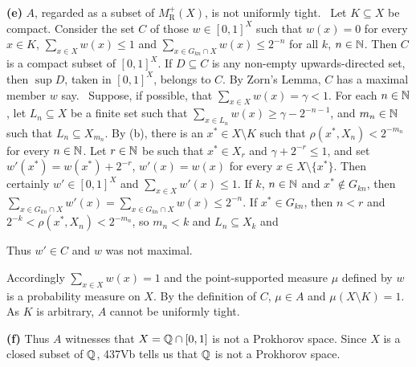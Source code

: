 {{\bf (e)} $A$, regarded as a subset of $M^+_{\text{R}}(X)$, is not
uniformly tight.
\Prf\ Let $K\subseteq X$ be compact.   Consider the set
$C$ of those $w\in[0,1]^X$ such that $w(x)=0$ for every $x\in K$,
$\sum_{x\in X}w(x)\le 1$ and $\sum_{x\in G_{kn}\cap X}w(x)\le 2^{-n}$
for all $k$, $n\in\Bbb N$.
Then $C$ is a compact subset of $[0,1]^X$.   If $D\subseteq C$ is any
non-empty upwards-directed set, then $\sup D$, taken in $[0,1]^X$,
belongs to $C$.   By Zorn's
Lemma, $C$ has a maximal member $w$ say.   \Quer\ Suppose, if possible,
that $\sum_{x\in X}w(x)=\gamma<1$.
For each $n\in\Bbb N$, let $L_n\subseteq X$ be a finite set such that
$\sum_{x\in L_n}w(x)\ge\gamma-2^{-n-1}$, and $m_n\in\Bbb N$ such that
$L_n\subseteq X_{m_n}$.
By (b), there is an $x^*\in X\setminus K$
such that $\rho(x^*,X_n)<2^{-m_n}$ for every $n\in\Bbb N$.   Let
$r\in\Bbb N$ be such that $x^*\in X_r$ and $\gamma+2^{-r}\le 1$, and set
$w'(x^*)=w(x^*)+2^{-r}$,
$w'(x)=w(x)$ for every $x\in X\setminus\{x^*\}$.   Then certainly
$w'\in[0,1]^X$ and $\sum_{x\in X}w'(x)\le 1$.   If $k$, $n\in\Bbb N$ and
$x^*\notin G_{kn}$, then $\sum_{x\in G_{kn}\cap X}w'(x)=\sum_{x\in
G_{kn}\cap X}w(x)\le 2^{-n}$.   If $x^*\in G_{kn}$, then $n<r$ and
$2^{-k}<\rho(x^*,X_n)<2^{-m_n}$, so $m_n<k$ and $L_n\subseteq X_k$ and



\noindent Thus $w'\in C$ and $w$ was not maximal.\ \Bang

Accordingly $\sum_{x\in X}w(x)=1$ and the point-supported measure $\mu$
defined by $w$ is a probability measure on $X$.   By the definition of
$C$, $\mu\in A$ and
$\mu(X\setminus K)=1$.   As $K$ is arbitrary, $A$ cannot be uniformly
tight.\ \Qed

\medskip

{\bf (f)} Thus $A$ witnesses that $X=\Bbb Q\cap[0,1]$ is not a Prokhorov
space.   Since $X$ is a closed subset of $\Bbb Q$, 437Vb tells us that
$\Bbb Q$ is not a Prokhorov space.
}%

